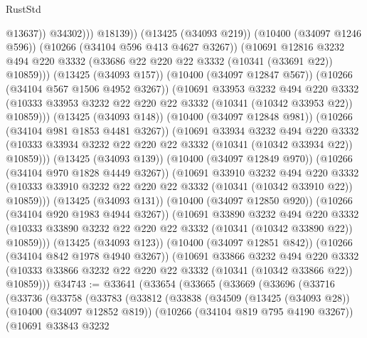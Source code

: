 \begin{lexlean}{RustStd}
\begin{coremodule}
                              @13637))
                          @34302)))
                    @18139))
                (@13425 (@34093 @219))
                (@10400 (@34097 @1246 @596))
                (@10266 (@34104 @596 @413 @4627 @3267))
                (@10691
                  @12816
                  @3232
                  @494
                  @220
                  @3332
                  (@33686 @22 @220 @22 @3332 (@10341 (@33691 @22)) @10859)))
              (@13425 (@34093 @157))
              (@10400 (@34097 @12847 @567))
              (@10266 (@34104 @567 @1506 @4952 @3267))
              (@10691
                @33953
                @3232
                @494
                @220
                @3332
                (@10333 @33953 @3232 @22 @220 @22 @3332 (@10341 (@10342 @33953 @22)) @10859)))
            (@13425 (@34093 @148))
            (@10400 (@34097 @12848 @981))
            (@10266 (@34104 @981 @1853 @4481 @3267))
            (@10691
              @33934
              @3232
              @494
              @220
              @3332
              (@10333 @33934 @3232 @22 @220 @22 @3332 (@10341 (@10342 @33934 @22)) @10859)))
          (@13425 (@34093 @139))
          (@10400 (@34097 @12849 @970))
          (@10266 (@34104 @970 @1828 @4449 @3267))
          (@10691
            @33910
            @3232
            @494
            @220
            @3332
            (@10333 @33910 @3232 @22 @220 @22 @3332 (@10341 (@10342 @33910 @22)) @10859)))
        (@13425 (@34093 @131))
        (@10400 (@34097 @12850 @920))
        (@10266 (@34104 @920 @1983 @4944 @3267))
        (@10691
          @33890
          @3232
          @494
          @220
          @3332
          (@10333 @33890 @3232 @22 @220 @22 @3332 (@10341 (@10342 @33890 @22)) @10859)))
      (@13425 (@34093 @123))
      (@10400 (@34097 @12851 @842))
      (@10266 (@34104 @842 @1978 @4940 @3267))
      (@10691
        @33866
        @3232
        @494
        @220
        @3332
        (@10333 @33866 @3232 @22 @220 @22 @3332 (@10341 (@10342 @33866 @22)) @10859)))
@34743 := @33641
    (@33654
      (@33665
        (@33669
          (@33696
            (@33716
              (@33736
                (@33758
                  (@33783
                    (@33812
                      (@33838
                        (@34509
                          (@13425 (@34093 @28))
                          (@10400 (@34097 @12852 @819))
                          (@10266 (@34104 @819 @795 @4190 @3267))
                          (@10691
                            @33843
                            @3232

\end{coremodule}
\end{lexlean}
